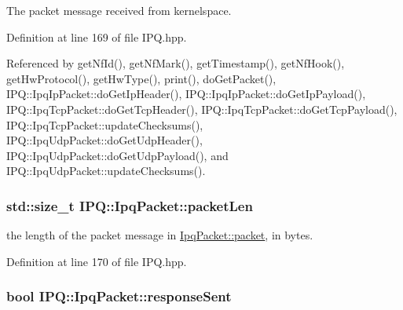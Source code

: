 \-The packet message received from kernelspace. 



\-Definition at line 169 of file \-I\-P\-Q.\-hpp.



\-Referenced by get\-Nf\-Id(), get\-Nf\-Mark(), get\-Timestamp(), get\-Nf\-Hook(), get\-Hw\-Protocol(), get\-Hw\-Type(), print(), do\-Get\-Packet(), \-I\-P\-Q\-::\-Ipq\-Ip\-Packet\-::do\-Get\-Ip\-Header(), \-I\-P\-Q\-::\-Ipq\-Ip\-Packet\-::do\-Get\-Ip\-Payload(), \-I\-P\-Q\-::\-Ipq\-Tcp\-Packet\-::do\-Get\-Tcp\-Header(), \-I\-P\-Q\-::\-Ipq\-Tcp\-Packet\-::do\-Get\-Tcp\-Payload(), \-I\-P\-Q\-::\-Ipq\-Tcp\-Packet\-::update\-Checksums(), \-I\-P\-Q\-::\-Ipq\-Udp\-Packet\-::do\-Get\-Udp\-Header(), \-I\-P\-Q\-::\-Ipq\-Udp\-Packet\-::do\-Get\-Udp\-Payload(), and \-I\-P\-Q\-::\-Ipq\-Udp\-Packet\-::update\-Checksums().

\hypertarget{classIPQ_1_1IpqPacket_a9b448a070c5ae499e32d2af5a190b86d}{
\subsubsection[{packet\-Len}]{\setlength{\rightskip}{0pt plus 5cm}std\-::size\-\_\-t {\bf \-I\-P\-Q\-::\-Ipq\-Packet\-::packet\-Len}}}
\label{classIPQ_1_1IpqPacket_a9b448a070c5ae499e32d2af5a190b86d}


the length of the packet message in \hyperlink{classIPQ_1_1IpqPacket_a2bdf247f13a3e9f86e9e3846e6a9cb45}{\-Ipq\-Packet\-::packet}, in bytes. 



\-Definition at line 170 of file \-I\-P\-Q.\-hpp.

\hypertarget{classIPQ_1_1IpqPacket_aa1a2044e8f04423ccc68a4c0a2142c6b}{
\subsubsection[{response\-Sent}]{\setlength{\rightskip}{0pt plus 5cm}bool {\bf \-I\-P\-Q\-::\-Ipq\-Packet\-::response\-Sent}}}
\label{classIPQ_1_1IpqPacket_aa1a2044e8f04423ccc68a4c0a2142c6b}


